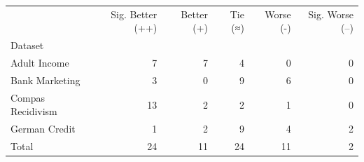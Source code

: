 \begin{tabular}{lrrrrr}
\toprule
 & Sig. Better (++) & Better (+) & Tie (≈) & Worse (-) & Sig. Worse (--) \\
Dataset &  &  &  &  &  \\
\midrule
Adult Income & 7 & 7 & 4 & 0 & 0 \\
Bank Marketing & 3 & 0 & 9 & 6 & 0 \\
Compas Recidivism & 13 & 2 & 2 & 1 & 0 \\
German Credit & 1 & 2 & 9 & 4 & 2 \\
Total & 24 & 11 & 24 & 11 & 2 \\
\bottomrule
\end{tabular}
